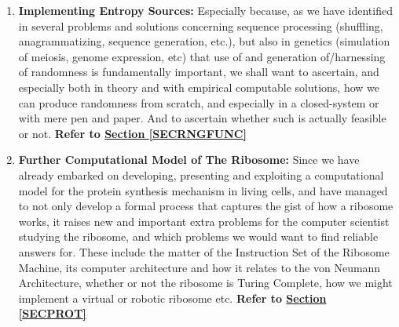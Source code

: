 \documentclass[a4paper, 18pt]{book} %
\begin{document}
\begin{enumerate}
\item \textbf{Implementing Entropy Sources:} Especially because, as we have identified in several problems and solutions concerning sequence processing (shuffling, anagrammatizing, sequence generation, etc.), but also in genetics (simulation of meiosis, genome expression, etc) that use of and generation of/harnessing of randomness is fundamentally important, we shall want to ascertain, and especially both in theory and with empirical computable solutions, how we can produce randomness from scratch, and especially in a closed-system or with mere pen and paper. And to ascertain whether such is actually feasible or not. \textbf{Refer to \textbf{\hyperref[SECRNGFUNC]{Section \ref{SECRNGFUNC}}}} 

\item \textbf{Further Computational Model of The Ribosome:} Since we have already embarked on developing, presenting and exploiting a computational model for the protein synthesis mechanism in living cells, and have managed to not only develop a formal process that captures the gist of how a ribosome works, it raises new and important extra problems for the computer scientist studying the ribosome, and which problems we would want to find reliable answers for. These include the matter of the Instruction Set of the Ribosome Machine, its computer architecture and how it relates to the von Neumann Architecture, whether or not the ribosome is Turing Complete, how we might implement a virtual or robotic ribosome etc. \textbf{Refer to \textbf{\hyperref[SECPROT]{Section \ref{SECPROT}}}} 


\end{enumerate}
\end{document}
